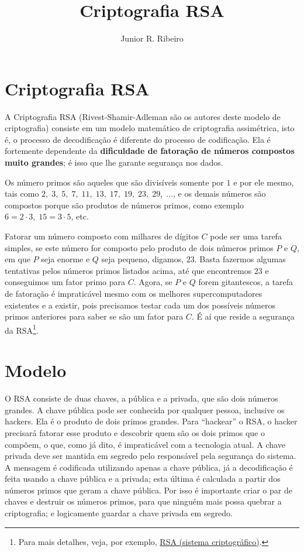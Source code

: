 \documentclass[a4paper, 12pt]{article} %
\title{Criptografia RSA}
\author{Junior R. Ribeiro}
\begin{document}
\maketitle


\section{Criptografia RSA}
A Criptografia RSA (Rivest-Shamir-Adleman são os autores deste modelo de criptografia) consiste em um modelo matemático de criptografia assimétrica, isto é, o processo de decodificação é diferente do processo de codificação. Ela é fortemente dependente da \textbf{dificuldade de fatoração de números compostos muito grandes}; é isso que lhe garante segurança nos dados.

Os número primos são aqueles que são divisíveis somente por $1$ e por ele mesmo, tais como $2,\; 3,\; 5,\; 7,\; 11,\; 13,\; 17,\; 19,\; 23,\; 29,\; \dots$, e os demais números são compostos porque são produtos de números primos, como exemplo $6=2\cdot 3,\; 15=3\cdot 5$, etc.

Fatorar um número composto com milhares de dígitos $C$ pode ser uma tarefa simples, se este número for composto pelo produto de dois números primos $P$ e $Q$, em que $P$ seja enorme e $Q$ seja pequeno, digamos, $23$. Basta fazermos algumas tentativas pelos números primos listados acima, até que encontremos $23$ e conseguimos um fator primo para $C$. Agora, se $P$ e $Q$ forem gitantescos, a tarefa de fatoração é impraticável mesmo com os melhores supercomputadores existentes e a existir, pois precisamos testar cada um dos possíveis números primos anteriores para saber se são um fator para $C$. É aí que reside a segurança da RSA\footnote{Para mais detalhes, veja, por exemplo, \href{https://pt.wikipedia.org/wiki/RSA_(sistema_criptográfico)}{RSA (sistema criptográfico)}.}. 

\section{Modelo}
O RSA consiste de duas chaves, a pública e a privada, que são dois números grandes. A chave pública pode ser conhecida por qualquer pessoa, inclusive os hackers. Ela é o produto de dois primos grandes. Para ``hackear'' o RSA, o hacker precisará fatorar esse produto e descobrir quem são os dois primos que o compõem, o que, como já dito, é impraticável com a tecnologia atual. A chave privada deve ser mantida em segredo pelo responsável pela segurança do sistema. A mensagem é codificada utilizando apenas a chave pública, já a decodificação é feita usando a chave pública e a privada; esta última é calculada a partir dos números primos que geram a chave pública. Por isso é importante criar o par de chaves e destruir os números primos, para que ninguém mais possa quebrar a criptografia; e logicamente guardar a chave privada em segredo.
\end{document}
